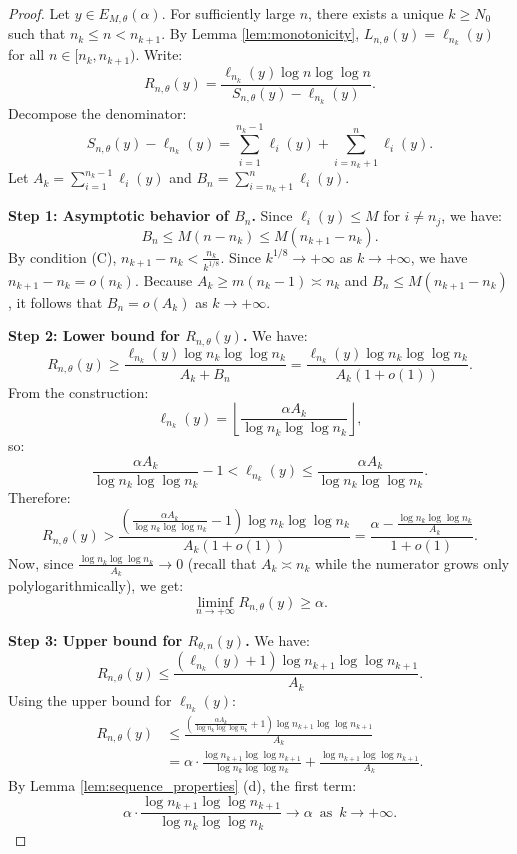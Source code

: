 \documentclass{article}
\numberwithin{equation}{section}
\begin{document}
\begin{proof}
Let $y \in E_{M,\theta}(\alpha)$. For sufficiently large $n$, there exists a unique $k \geq N_0$ such that $n_k \leq n < n_{k+1}$.
By Lemma \ref{lem:monotonicity}, $L_{n,\theta}(y) = \ell_{n_k}(y)$ for all $n \in [n_k, n_{k+1})$. Write:
\[
R_{n,\theta}(y) = \frac{\ell_{n_k}(y) \log n \log \log n}{S_{n,\theta}(y) - \ell_{n_k}(y)}.
\]
Decompose the denominator:
\[
S_{n,\theta}(y) - \ell_{n_k}(y) = \sum_{i=1}^{n_k-1} \ell_i(y) + \sum_{i=n_k+1}^n \ell_i(y).
\]
Let $A_k = \displaystyle \sum_{i=1}^{n_k-1} \ell_i(y)$ and $B_n = \displaystyle \sum_{i=n_k+1}^n \ell_i(y)$.

\noindent \textbf{Step 1: Asymptotic behavior of $B_n$.}
Since $\ell_i(y) \leq M$ for $i \neq n_j$, we have:
\[
B_n \leq M(n - n_k) \leq M(n_{k+1} - n_k).
\]
By condition (C), $n_{k+1} - n_k < \frac{n_k}{k^{1/8}}$. 
Since $k^{1/8} \to +\infty$ as $k \to +\infty$, we have $n_{k+1} - n_k = o(n_k)$. 
{Because $A_k \geq m(n_k - 1) \asymp n_k$ and $B_n \leq M(n_{k+1} - n_k)$, it follows that $B_n = o(A_k)$ as $k \to +\infty$.}

\noindent \textbf{Step 2: Lower bound for $R_{n,\theta}(y)$.}
We have:
\[
R_{n,\theta}(y) \geq \frac{\ell_{n_k}(y) \log n_k \log \log n_k}{A_k + B_n}= \frac{\ell_{n_k}(y) \log n_k \log \log n_k}{A_k(1 + o(1))}.
\]
%
From the construction:
\[
\ell_{n_k}(y) = \left\lfloor \frac{\alpha A_k}{\log n_k \log \log n_k} \right\rfloor,
\]
so:
\[
\frac{\alpha A_k}{\log n_k \log \log n_k} - 1 < \ell_{n_k}(y) \leq \frac{\alpha A_k}{\log n_k \log \log n_k}.
\]
Therefore:
\[
R_{n,\theta}(y) > \frac{\left( \frac{\alpha A_k}{\log n_k \log \log n_k} - 1 \right) \log n_k \log \log n_k}{A_k(1 + o(1))} = \frac{\alpha - \frac{\log n_k \log \log n_k}{A_k}}{1 + o(1)}.
\]
Now, since $\frac{\log n_k \log \log n_k}{A_k} \to 0$ {(recall that $A_k \asymp n_k$ while the numerator grows only polylogarithmically)}, we get:
\[
\liminf_{n \to +\infty} R_{n,\theta}(y) \geq \alpha.
\]

\noindent \textbf{Step 3: Upper bound for $R_{\theta,n}(y)$.}
We have: 
\[
R_{n,\theta}(y) \leq \frac{(\ell_{n_k}(y) + 1) \log n_{k+1} \log \log n_{k+1}}{A_k}.
\]
Using the upper bound for $\ell_{n_k}(y)$:
\begin{align*}
R_{n,\theta}(y) &\leq \frac{\left( \frac{\alpha A_k}{\log n_k \log \log n_k} + 1 \right) \log n_{k+1} \log \log n_{k+1}}{A_k} \\
&= \alpha \cdot \frac{\log n_{k+1} \log \log n_{k+1}}{\log n_k \log \log n_k} + \frac{\log n_{k+1} \log \log n_{k+1}}{A_k}.
\end{align*}
%
By Lemma \ref{lem:sequence_properties} (d), the first term:
\[
\alpha \cdot \frac{\log n_{k+1} \log \log n_{k+1}}{\log n_k \log \log n_k} \to \alpha \, \mbox{ as } \, k \to +\infty. 
\]


\end{proof}
\end{document}
